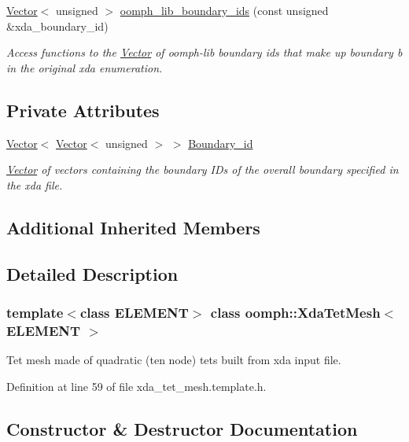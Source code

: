 \begin{DoxyCompactItemize}
\hyperlink{classoomph_1_1Vector}{Vector}$<$ unsigned $>$ \hyperlink{classoomph_1_1XdaTetMesh_ab690c0224586bfc7b46ff173da855ddd}{oomph\+\_\+lib\+\_\+boundary\+\_\+ids} (const unsigned \&xda\+\_\+boundary\+\_\+id)
\begin{DoxyCompactList}\small\item\em Access functions to the \hyperlink{classoomph_1_1Vector}{Vector} of oomph-\/lib boundary ids that make up boundary b in the original xda enumeration. \end{DoxyCompactList}\end{DoxyCompactItemize}
\subsection*{Private Attributes}
\begin{DoxyCompactItemize}
\item 
\hyperlink{classoomph_1_1Vector}{Vector}$<$ \hyperlink{classoomph_1_1Vector}{Vector}$<$ unsigned $>$ $>$ \hyperlink{classoomph_1_1XdaTetMesh_a1774abc96e730c89e95b99933a7c0ae3}{Boundary\+\_\+id}
\begin{DoxyCompactList}\small\item\em \hyperlink{classoomph_1_1Vector}{Vector} of vectors containing the boundary I\+Ds of the overall boundary specified in the xda file. \end{DoxyCompactList}\end{DoxyCompactItemize}
\subsection*{Additional Inherited Members}


\subsection{Detailed Description}
\subsubsection*{template$<$class E\+L\+E\+M\+E\+NT$>$\newline
class oomph\+::\+Xda\+Tet\+Mesh$<$ E\+L\+E\+M\+E\+N\+T $>$}

Tet mesh made of quadratic (ten node) tets built from xda input file. 

Definition at line 59 of file xda\+\_\+tet\+\_\+mesh.\+template.\+h.



\subsection{Constructor \& Destructor Documentation}
\mbox{\label{classoomph_1_1XdaTetMesh_a4cea32a11d0899ac230de66899e503d1}} 
